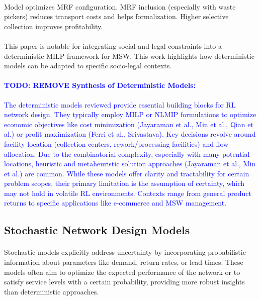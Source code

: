 \paragraph{} Model optimizes MRF configuration. MRF inclusion (especially with waste pickers) reduces transport costs and helps formalization. Higher selective collection improves profitability.

\paragraph{} This paper is notable for integrating social and legal constraints into a deterministic MILP framework for MSW. This work highlights how deterministic models can be adapted to specific socio-legal contexts.

\textcolor{blue}
{\paragraph{TODO: REMOVE Synthesis of Deterministic Models:}
The deterministic models reviewed provide essential building blocks for RL network design. They typically employ MILP or NLMIP formulations to optimize economic objectives like cost minimization (Jayaraman et al., Min et al., Qian et al.) or profit maximization (Ferri et al., Srivastava). Key decisions revolve around facility location (collection centers, rework/processing facilities) and flow allocation. Due to the combinatorial complexity, especially with many potential locations, heuristic and metaheuristic solution approaches (Jayaraman et al., Min et al.) are common. While these models offer clarity and tractability for certain problem scopes, their primary limitation is the assumption of certainty, which may not hold in volatile RL environments. Contexts range from general product returns to specific applications like e-commerce and MSW management.}

\subsection{Stochastic Network Design Models}

\paragraph{} Stochastic models explicitly address uncertainty by incorporating probabilistic information about parameters like demand, return rates, or lead times. These models often aim to optimize the expected performance of the network or to satisfy service levels with a certain probability, providing more robust insights than deterministic approaches.

